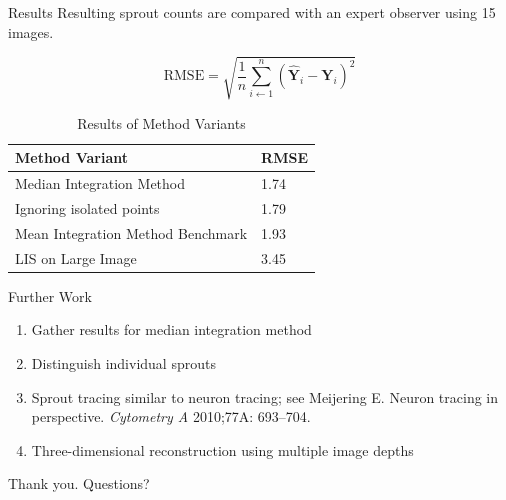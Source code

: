 \documentclass{beamer}
\begin{document}
\begin{frame}{Results}
	Resulting sprout counts are compared with an expert observer using 15
	images.

	\begin{equation}
		\text{RMSE} = \sqrt{\frac{1}{n}\sum^n_{i\gets 1} (\mathbf{\hat{Y}}_i - \mathbf{Y}_i)^2}
	\end{equation}

	\begin{table}
		\begin{tabular}{|l|l|}
			\hline
			\textbf{Method Variant} & RMSE \\\hline
			Median Integration Method & 1.74 \\\hline
			Ignoring isolated points & 1.79 \\\hline
			Mean Integration Method Benchmark & 1.93 \\\hline
			LIS on Large Image & 3.45 \\\hline
		\end{tabular}
		\caption{Results of Method Variants}
	\end{table}
\end{frame}

\begin{frame}{Further Work}
	\begin{enumerate}
		\item Gather results for median integration method
		\item Distinguish individual sprouts
		\item Sprout tracing similar to neuron tracing; see Meijering E.
			Neuron tracing in perspective. \emph{Cytometry A} 2010;77A:
			693–704. 
		\item Three-dimensional reconstruction using multiple image depths
	\end{enumerate}
\end{frame}

% 
% 
\begin{frame}
	\centering
	Thank you. Questions?
\end{frame}
\end{document}
